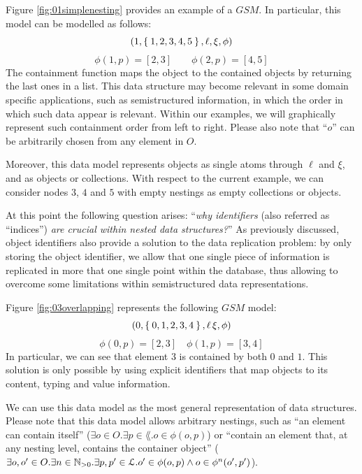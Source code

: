 \begin{example}[label=ex:nineteedGSMfrst]
	Figure \vref{fig:01simplenesting} provides an example of a $GSM$. In particular, this model can be modelled as follows:
	\[(1,\Set{1,2,3,4,5},\ell,\xi,\phi)\]
	\[\phi(1,p)=[2,3]\qquad \phi(2,p)=[4,5]\]
	The containment function maps the object to the contained objects by returning the last ones in a list. This data structure may become
	relevant in some domain specific applications, such as semistructured information, in which the order in which such data appear is relevant. Within our
	examples, we will graphically represent such containment order from left to right. Please also note that ``$o$'' can be arbitrarily chosen from any element in $O$.
	
	Moreover, this data model  represents objects as single atoms through $\ell$ and $\xi$, and as objects or   collections. With respect to the current example, we can consider nodes $3$, $4$ and $5$ with empty nestings as empty collections or objects.
\end{example}

At this point the following question arises: ``\textit{why identifiers} (also referred as ``indices'') \textit{are crucial within nested data structures?}'' As previously discussed, object identifiers also provide a solution to the data replication problem: by only storing the object identifier, we allow that one single piece of information is replicated in more that one single point within the database, thus allowing to overcome some limitations within semistructured data representations.

\begin{example}[continues=ex:nineteedGSMfrst,label=ex:nineteedGSMsnd]
	Figure \vref{fig:03overlapping} represents the following $GSM$ model:
	\[(0,\Set{0,1,2,3,4},\ell\,\xi,\phi)\]
	\[\phi(0,p)=[2,3]\quad \phi(1,p)=[3,4]\]
	In particular, we can see that element $3$ is contained by both $0$ and $1$. This solution is only possible by using explicit identifiers that map objects to its content, typing and value information.
\end{example}

We can use this data model as the most general representation of data structures. Please note that this data model allows arbitrary nestings, such as ``an element can contain itself'' ($\exists o\in O.\exists p\in\lang. o\in \phi(o,p)$) or  ``contain an element that, at any nesting level, contains the container object'' ($\exists o,o'\in O.\exists n\in\nat_{>0}.\exists p,p'\in\lang. o'\in \phi(o,p)\wedge o\in \phi^n(o',p')$). 

